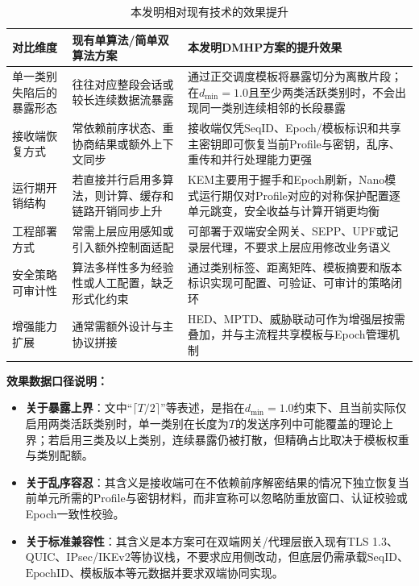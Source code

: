 ﻿\documentclass[12pt,a4paper]{article}
\begin{document}
\begin{table}[H]
\centering
\small
\setlength{\tabcolsep}{4pt}
\begin{tabular}{|>{\raggedright\arraybackslash}p{2.9cm}|>{\raggedright\arraybackslash}p{4.3cm}|>{\raggedright\arraybackslash}p{5.8cm}|}
\hline
\textbf{对比维度} & \textbf{现有单算法/简单双算法方案} & \textbf{本发明DMHP方案的提升效果} \\ \hline
单一类别失陷后的暴露形态 & 往往对应整段会话或较长连续数据流暴露 & 通过正交调度模板将暴露切分为离散片段；在$d_{\min}=1.0$且至少两类活跃类别时，不会出现同一类别连续相邻的长段暴露 \\ \hline
接收端恢复方式 & 常依赖前序状态、重协商结果或额外上下文同步 & 接收端仅凭$\text{SeqID}$、Epoch/模板标识和共享主密钥即可恢复当前Profile与密钥，乱序、重传和并行处理能力更强 \\ \hline
运行期开销结构 & 若直接并行启用多算法，则计算、缓存和链路开销同步上升 & KEM主要用于握手和Epoch刷新，Nano模式运行期仅对Profile对应的对称保护配置逐单元跳变，安全收益与计算开销更均衡 \\ \hline
工程部署方式 & 常需上层应用感知或引入额外控制面适配 & 可部署于双端安全网关、SEPP、UPF或记录层代理，不要求上层应用修改业务语义 \\ \hline
安全策略可审计性 & 算法多样性多为经验性或人工配置，缺乏形式化约束 & 通过类别标签、距离矩阵、模板摘要和版本标识实现可配置、可验证、可审计的策略闭环 \\ \hline
增强能力扩展 & 通常需额外设计与主协议拼接 & HED、MPTD、威胁联动可作为增强层按需叠加，并与主流程共享模板与Epoch管理机制 \\ \hline
\end{tabular}
\caption{本发明相对现有技术的效果提升}
\end{table}

\textbf{效果数据口径说明：}
\begin{itemize}
    \item \textbf{关于暴露上界}：文中“$\lceil T/2 \rceil$”等表述，是指在$d_{\min}=1.0$约束下、且当前实际仅启用两类活跃类别时，单一类别在长度为$T$的发送序列中可能覆盖的理论上界；若启用三类及以上类别，连续暴露仍被打散，但精确占比取决于模板权重与类别配额。
    \item \textbf{关于乱序容忍}：其含义是接收端可在不依赖前序解密结果的情况下独立恢复当前单元所需的Profile与密钥材料，而非宣称可以忽略防重放窗口、认证校验或Epoch一致性校验。
    \item \textbf{关于标准兼容性}：其含义是本方案可在双端网关/代理层嵌入现有TLS 1.3、QUIC、IPsec/IKEv2等协议栈，不要求应用侧改动，但底层仍需承载$\text{SeqID}$、$\text{EpochID}$、模板版本等元数据并要求双端协同实现。
\end{itemize}
\end{document}
